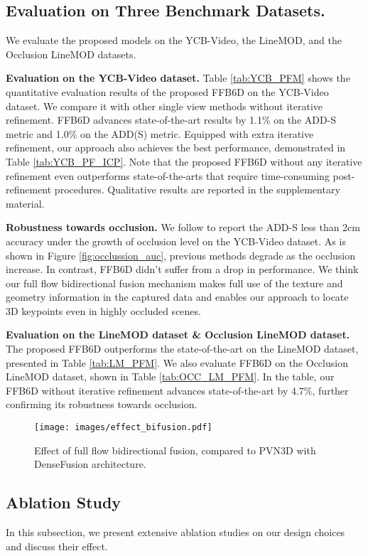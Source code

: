 \subsection{Evaluation on Three Benchmark Datasets.}
We evaluate the proposed models on the YCB-Video, the LineMOD, and the Occlusion LineMOD datasets.

\textbf{Evaluation on the YCB-Video dataset.} Table \ref{tab:YCB_PFM} shows the quantitative evaluation results of the proposed FFB6D on the YCB-Video dataset. We compare it with other single view methods without iterative refinement. FFB6D advances state-of-the-art results by 1.1\% on the ADD-S metric and 1.0\% on the ADD(S) metric. Equipped with extra iterative refinement, our approach also achieves the best performance, demonstrated in Table \ref{tab:YCB_PF_ICP}. Note that the proposed FFB6D without any iterative refinement even outperforms state-of-the-arts that require time-consuming post-refinement procedures. Qualitative results are reported in the supplementary material. 

\textbf{Robustness towards occlusion.} We follow \cite{wang2019densefusion,he2020pvn3d} to report the ADD-S less than 2cm accuracy under the growth of occlusion level on the YCB-Video dataset. As is shown in Figure \ref{fig:occlussion_auc}, previous methods degrade as the occlusion increase. In contrast, FFB6D didn't suffer from a drop in performance. We think our full flow bidirectional fusion mechanism makes full use of the texture and geometry information in the captured data and enables our approach to locate 3D keypoints even in highly occluded scenes. 

\textbf{Evaluation on the LineMOD dataset \& Occlusion LineMOD dataset.} The proposed FFB6D outperforms the state-of-the-art on the LineMOD dataset, presented in Table \ref{tab:LM_PFM}. We also evaluate FFB6D on the Occlusion LineMOD dataset, shown in Table \ref{tab:OCC_LM_PFM}. In the table, our FFB6D without iterative refinement advances state-of-the-art by 4.7\%, further confirming its robustness towards occlusion.


\begin{figure*}
  \centering
     \texttt{[image: images/effect\_bifusion.pdf]}
     \caption{
         Effect of full flow bidirectional fusion, compared to PVN3D \cite{he2020pvn3d} with DenseFusion architecture.
}
     \label{fig:eff_BiF}
\end{figure*}


\subsection{Ablation Study}
In this subsection, we present extensive ablation studies on our design choices and discuss their effect. 

